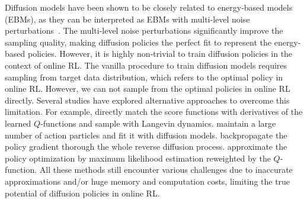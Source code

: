 Diffusion models have been shown to be closely related to energy-based models (EBMs), as they can be interpreted as EBMs with multi-level noise perturbations~\cite{song2019generative, shribak2024diffusion}. The multi-level noise perturbations significantly improve the sampling quality, making diffusion policies the perfect fit to represent the energy-based policies. 
However, it is highly non-trivial to train diffusion policies in the context of online RL. The vanilla procedure to train diffusion models requires sampling from target data distribution, which refers to the optimal policy in online RL. However, we can not sample from the optimal policies in online RL directly. Several studies have explored alternative approaches to overcome this limitation.
For example, \citet{psenka2023learning,jain2024sampling} directly match the score functions with derivatives of the learned $Q$-functions and sample with Langevin dynamics.
\citet{yang2023policy} maintain a large number of action particles and fit it with diffusion models. \citet{wang2024diffusion} backpropagate the policy gradient thorough the whole reverse diffusion process. \citet{ding2024diffusion} approximate the policy optimization by maximum likelihood estimation reweighted by the $Q$-function. 
All these methods still encounter various challenges due to inaccurate approximations and/or huge memory and computation costs, limiting the true potential of diffusion policies in online RL.

